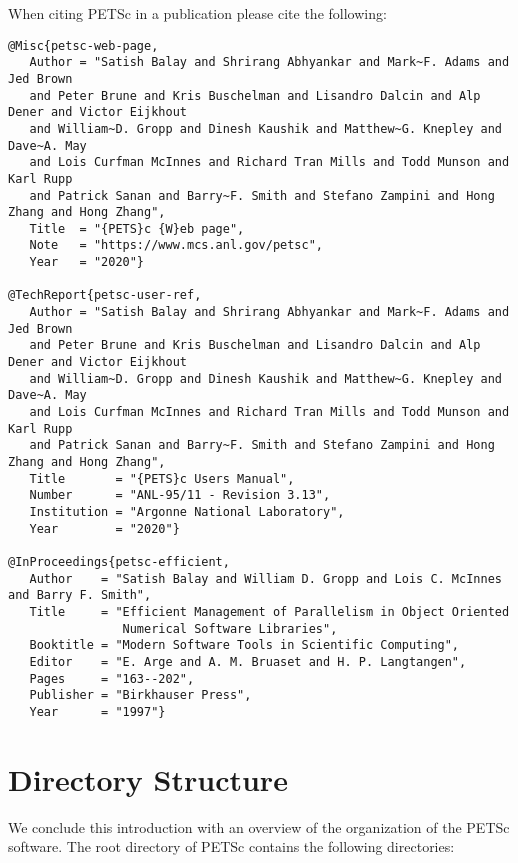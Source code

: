 When citing PETSc in a publication please cite the following:
\begin{verbatim}
@Misc{petsc-web-page,
   Author = "Satish Balay and Shrirang Abhyankar and Mark~F. Adams and Jed Brown
   and Peter Brune and Kris Buschelman and Lisandro Dalcin and Alp Dener and Victor Eijkhout
   and William~D. Gropp and Dinesh Kaushik and Matthew~G. Knepley and Dave~A. May
   and Lois Curfman McInnes and Richard Tran Mills and Todd Munson and Karl Rupp
   and Patrick Sanan and Barry~F. Smith and Stefano Zampini and Hong Zhang and Hong Zhang",
   Title  = "{PETS}c {W}eb page",
   Note   = "https://www.mcs.anl.gov/petsc",
   Year   = "2020"}

@TechReport{petsc-user-ref,
   Author = "Satish Balay and Shrirang Abhyankar and Mark~F. Adams and Jed Brown
   and Peter Brune and Kris Buschelman and Lisandro Dalcin and Alp Dener and Victor Eijkhout
   and William~D. Gropp and Dinesh Kaushik and Matthew~G. Knepley and Dave~A. May
   and Lois Curfman McInnes and Richard Tran Mills and Todd Munson and Karl Rupp
   and Patrick Sanan and Barry~F. Smith and Stefano Zampini and Hong Zhang and Hong Zhang",
   Title       = "{PETS}c Users Manual",
   Number      = "ANL-95/11 - Revision 3.13",
   Institution = "Argonne National Laboratory",
   Year        = "2020"}

@InProceedings{petsc-efficient,
   Author    = "Satish Balay and William D. Gropp and Lois C. McInnes and Barry F. Smith",
   Title     = "Efficient Management of Parallelism in Object Oriented
                Numerical Software Libraries",
   Booktitle = "Modern Software Tools in Scientific Computing",
   Editor    = "E. Arge and A. M. Bruaset and H. P. Langtangen",
   Pages     = "163--202",
   Publisher = "Birkhauser Press",
   Year      = "1997"}
\end{verbatim}


\section{Directory Structure}
\label{sec_directory}

We conclude this introduction with an overview of the
organization of the PETSc software.
The root directory of PETSc contains the following directories:

